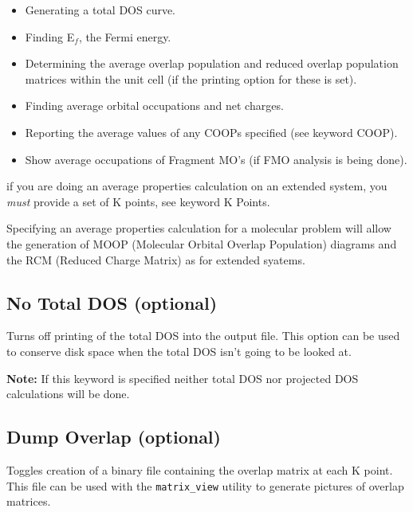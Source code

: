 \begin{itemize}

\item Generating a total DOS curve.

\item Finding E$_f$, the Fermi energy.

\item Determining the average overlap population and reduced overlap
population matrices within the unit cell (if the printing option for
these is set).

\item Finding average orbital occupations and net charges.

\item Reporting the average values of any COOPs specified (see
keyword {\sf COOP}).

\item Show average occupations of Fragment MO's (if FMO analysis is
being done).

\end{itemize}

 if you are doing an average properties calculation on an
extended system, you
{\em must} provide a set of K points, see keyword {\sf K Points}.

Specifying an average properties calculation for a molecular problem
will allow the generation of MOOP (Molecular Orbital Overlap
Population) diagrams and the RCM (Reduced Charge Matrix) as for
extended syatems.

\subsection{{\sf No Total DOS} (optional)}

Turns off printing of the total DOS into the output file.  This option
can be used to conserve disk space when the total DOS isn't going to
be looked at.  

{\bf Note:}  If this keyword is specified neither total DOS nor
projected DOS calculations will be done.


\subsection{{\sf Dump Overlap} (optional)}

Toggles creation of a binary file containing the overlap matrix at
each K point.  This file can be used with the {\tt matrix\_view} utility to
generate pictures of overlap matrices.

